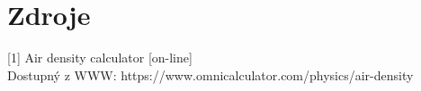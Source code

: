 \documentclass[czech,11pt,a4paper]{article}
\begin{document}
	\section{Zdroje}
[1] Air density calculator [on-line]\\ Dostupný z WWW: https://www.omnicalculator.com/physics/air-density
	
	
	
\end{document}
